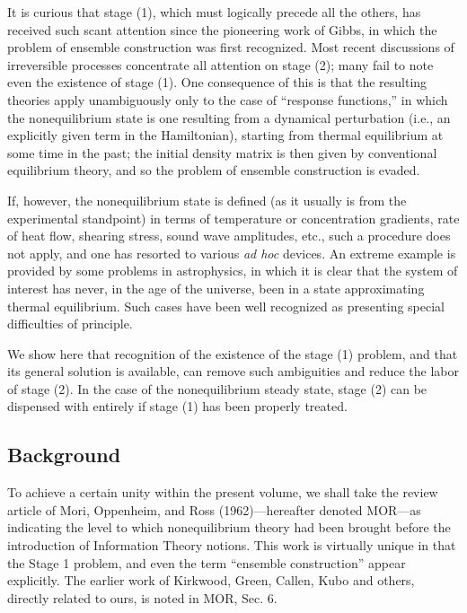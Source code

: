 It is curious that stage (1), which must logically precede all the others, has received such scant attention since the pioneering work of Gibbs, in which the problem of ensemble construction was first recognized.
Most recent discussions of irreversible processes concentrate all attention on stage (2); many fail to note even the existence of stage (1).
One consequence of this is that the resulting theories apply unambiguously only to the case of ``response functions,'' in which the nonequilibrium state is one resulting from a dynamical perturbation (i.e., an explicitly given term in the Hamiltonian), starting from thermal equilibrium at some time in the past; the initial density matrix is then given by conventional equilibrium theory, and so the problem of ensemble construction is evaded.

If, however, the nonequilibrium state is defined (as it usually is from the experimental standpoint) in terms of temperature or concentration gradients, rate of heat flow, shearing stress, sound wave amplitudes, etc., such a procedure does not apply, and one has resorted to various \emph{ad hoc} devices.
An extreme example is provided by some problems in astrophysics, in which it is clear that the system of interest has never, in the age of the universe, been in a state approximating thermal equilibrium.
Such cases have been well recognized as presenting special difficulties of principle.

We show here that recognition of the existence of the stage (1) problem, and that its general solution is available, can remove such ambiguities and reduce the labor of stage (2).
In the case of the nonequilibrium steady state, stage (2) can be dispensed with entirely if stage (1) has been properly treated.


\subsection{Background}
To achieve a certain unity within the present volume, we shall take the review article of \cite{mori}{Mori, Oppenheim, and Ross (1962)}---hereafter denoted MOR---as indicating the level to which nonequilibrium theory had been brought before the introduction of Information Theory notions.
This work is virtually unique in that the Stage 1 problem, and even the term ``ensemble construction'' appear explicitly.
The earlier work of Kirkwood, Green, Callen, Kubo and others, directly related to ours, is noted in MOR, Sec. 6.


